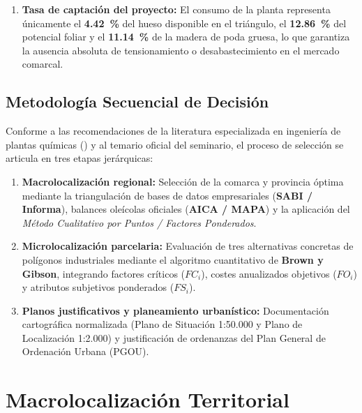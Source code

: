 \documentclass{report}
\begin{document}
\begin{enumerate}
    \item \textbf{Tasa de captación del proyecto:} El consumo de la planta representa únicamente el \textbf{\SI{4.42}{\percent}} del hueso disponible en el triángulo, el \textbf{\SI{12.86}{\percent}} del potencial foliar y el \textbf{\SI{11.14}{\percent}} de la madera de poda gruesa, lo que garantiza la ausencia absoluta de tensionamiento o desabastecimiento en el mercado comarcal.
\end{enumerate}

\section{Metodología Secuencial de Decisión}
Conforme a las recomendaciones de la literatura especializada en ingeniería de plantas químicas (\textcite{PetersTimmerhaus2003, Turton2018}) y al temario oficial del seminario, el proceso de selección se articula en tres etapas jerárquicas:
\begin{enumerate}
    \item \textbf{Macrolocalización regional:} Selección de la comarca y provincia óptima mediante la triangulación de bases de datos empresariales (\textbf{SABI / Informa}), balances oleícolas oficiales (\textbf{AICA / MAPA}) y la aplicación del \textit{Método Cualitativo por Puntos / Factores Ponderados}.
    \item \textbf{Microlocalización parcelaria:} Evaluación de tres alternativas concretas de polígonos industriales mediante el algoritmo cuantitativo de \textbf{Brown y Gibson}, integrando factores críticos ($FC_i$), costes anualizados objetivos ($FO_i$) y atributos subjetivos ponderados ($FS_i$).
    \item \textbf{Planos justificativos y planeamiento urbanístico:} Documentación cartográfica normalizada (Plano de Situación 1:50.000 y Plano de Localización 1:2.000) y justificación de ordenanzas del Plan General de Ordenación Urbana (PGOU).
\end{enumerate}

\chapter{Macrolocalización Territorial}
\end{document}
